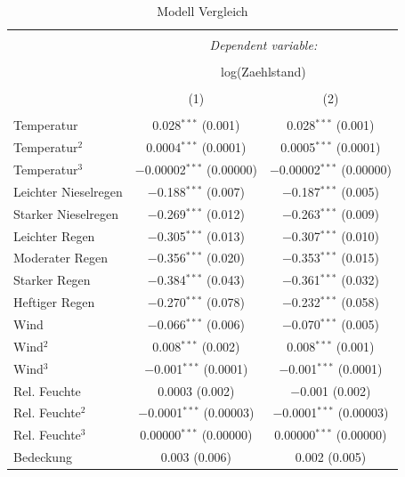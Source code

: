 \documentclass[a4paper,12pt]{thesis}
\begin{document}
	\begin{longtable}{@{\extracolsep{-5pt}}lcc} 
		\caption{Modell Vergleich} 
		\label{ZweiModelle}
	\small 
		\\[-1.8ex]\hline 
		\hline \\[-1.8ex] 
		& \multicolumn{2}{c}{\textit{Dependent variable:}} \\ 
		\cline{2-3} 
		\\[-1.8ex] & \multicolumn{2}{c}{log(Zaehlstand)} \\ 
		\\[-1.8ex] & (1) & (2)\\ 
		\hline \\[-1.8ex] 
		Temperatur & 0.028$^{***}$ (0.001) & 0.028$^{***}$ (0.001) \\ 
		Temperatur$^2$ & 0.0004$^{***}$ (0.0001) & 0.0005$^{***}$ (0.0001) \\ 
		Temperatur$^3$ & $-$0.00002$^{***}$ (0.00000) & $-$0.00002$^{***}$ (0.00000) \\ 
		Leichter Nieselregen & $-$0.188$^{***}$ (0.007) & $-$0.187$^{***}$ (0.005) \\ 
		Starker Nieselregen & $-$0.269$^{***}$ (0.012) & $-$0.263$^{***}$ (0.009) \\ 
		Leichter Regen & $-$0.305$^{***}$ (0.013) & $-$0.307$^{***}$ (0.010) \\ 
		Moderater Regen & $-$0.356$^{***}$ (0.020) & $-$0.353$^{***}$ (0.015) \\ 
		Starker Regen & $-$0.384$^{***}$ (0.043) & $-$0.361$^{***}$ (0.032) \\ 
		Heftiger Regen & $-$0.270$^{***}$ (0.078) & $-$0.232$^{***}$ (0.058) \\ 
		Wind & $-$0.066$^{***}$ (0.006) & $-$0.070$^{***}$ (0.005) \\ 
		Wind$^2$ & 0.008$^{***}$ (0.002) & 0.008$^{***}$ (0.001) \\ 
		Wind$^3$ & $-$0.001$^{***}$ (0.0001) & $-$0.001$^{***}$ (0.0001) \\ 
		Rel. Feuchte & 0.0003 (0.002) & $-$0.001 (0.002) \\ 
		Rel. Feuchte$^2$ & $-$0.0001$^{***}$ (0.00003) & $-$0.0001$^{***}$ (0.00003) \\ 
		Rel. Feuchte$^3$ & 0.00000$^{***}$ (0.00000) & 0.00000$^{***}$ (0.00000) \\ 
		Bedeckung & 0.003 (0.006) & 0.002 (0.005) \\ 

\end{longtable}
\end{document}
